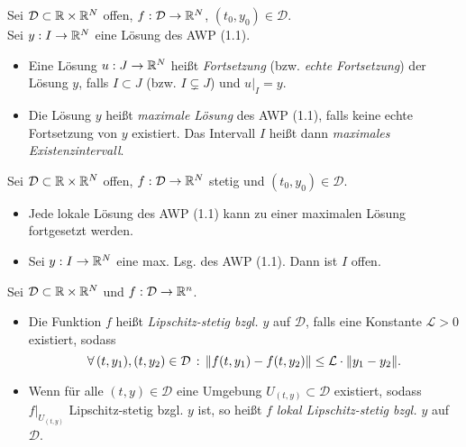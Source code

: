 \documentclass{cheat-sheet}
\newcommand{\D}{\mathcal{D}}
\begin{document}

\begin{defn}
  Sei $\D \subset \R \times \R^N$ offen, $f : \D \to \R^N$, $(t_0, y_0) \in \D$. \\
  Sei $y : I \to \mathbb{R}^N$ eine Lösung des AWP (1.1).
  \begin{itemize}
    \item Eine Lösung $u : J \to \mathbb{R}^N$ heißt \emph{Fortsetzung} (bzw. \emph{echte Fortsetzung}) der Lösung $y$, falls $I \subset J$ (bzw. $I \subsetneq J$) und $u|_I = y$.
    \item Die Lösung $y$ heißt \emph{maximale Lösung} des AWP (1.1), falls keine echte Fortsetzung von $y$ existiert. Das Intervall $I$ heißt dann \emph{maximales Existenzintervall}.
  \end{itemize}
\end{defn}


\begin{satz}
  Sei $\D \subset \R \times \R^N$ offen, $f : \D \to \R^N$ stetig und $(t_0, y_0) \in \D$.
  \begin{itemize}
    \item Jede lokale Lösung des AWP (1.1) kann zu einer maximalen Lösung fortgesetzt werden.
    \item Sei $y : I \to \mathbb{R}^N$ eine max. Lsg. des AWP (1.1). Dann ist $I$ offen.
  \end{itemize}
\end{satz}


\begin{defn}
  Sei $\D \subset \R \times \R^N$ und $f : \D \to \R^n$.
  \begin{itemize}
    \item Die Funktion $f $ heißt \emph{Lipschitz-stetig bzgl. $y$} auf $\D$, falls eine Konstante $\mathcal{L} > 0$ existiert, sodass
    \[ \fa{(t, y_1), (t, y_2) \in \D} \norm{f(t, y_1) - f(t, y_2)} \leq \mathcal{L} \cdot \norm{y_1 - y_2}. \]
    \item Wenn für alle $(t, y) \in \D$ eine Umgebung $U_{(t, y)} \subset \D$ existiert, sodass $f|_{U_{(t,y)}}$ Lipschitz-stetig bzgl. $y$ ist, so heißt $f$ \emph{lokal Lipschitz-stetig bzgl. $y$} auf $\D$.
  \end{itemize}
\end{defn}
\end{document}
